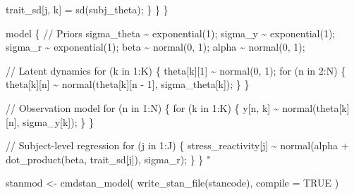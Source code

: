 \documentclass[
  11pt,
  a4paper,
  onecolumn]{article}
\newenvironment{Shaded}{}{}
\newcommand{\AttributeTok}[1]{\textcolor[rgb]{0.84,0.23,0.29}{#1}}
\newcommand{\CommentTok}[1]{\textcolor[rgb]{0.42,0.45,0.49}{#1}}
\newcommand{\ConstantTok}[1]{\textcolor[rgb]{0.00,0.36,0.77}{#1}}
\newcommand{\DecValTok}[1]{\textcolor[rgb]{0.00,0.36,0.77}{#1}}
\newcommand{\FunctionTok}[1]{\textcolor[rgb]{0.44,0.26,0.76}{#1}}
\newcommand{\NormalTok}[1]{\textcolor[rgb]{0.14,0.16,0.18}{#1}}
\newcommand{\OtherTok}[1]{\textcolor[rgb]{0.44,0.26,0.76}{#1}}
\newcommand{\SpecialCharTok}[1]{\textcolor[rgb]{0.00,0.36,0.77}{#1}}
\newcommand{\StringTok}[1]{\textcolor[rgb]{0.01,0.18,0.38}{#1}}
\begin{document}
\begin{Shaded}
\begin{Highlighting}[]
\StringTok{      trait\_sd[j, k] = sd(subj\_theta);}
\StringTok{    \}}
\StringTok{  \}}
\StringTok{\}}

\StringTok{model \{}
\StringTok{  // Priors}
\StringTok{  sigma\_theta \textasciitilde{} exponential(1);}
\StringTok{  sigma\_y \textasciitilde{} exponential(1);}
\StringTok{  sigma\_r \textasciitilde{} exponential(1);}
\StringTok{  beta \textasciitilde{} normal(0, 1);}
\StringTok{  alpha \textasciitilde{} normal(0, 1);}

\StringTok{  // Latent dynamics}
\StringTok{  for (k in 1:K) \{}
\StringTok{    theta[k][1] \textasciitilde{} normal(0, 1);}
\StringTok{    for (n in 2:N) \{}
\StringTok{      theta[k][n] \textasciitilde{} normal(theta[k][n {-} 1], sigma\_theta[k]);}
\StringTok{    \}}
\StringTok{  \}}

\StringTok{  // Observation model}
\StringTok{  for (n in 1:N) \{}
\StringTok{    for (k in 1:K) \{}
\StringTok{      y[n, k] \textasciitilde{} normal(theta[k][n], sigma\_y[k]);}
\StringTok{    \}}
\StringTok{  \}}

\StringTok{  // Subject{-}level regression}
\StringTok{  for (j in 1:J) \{}
\StringTok{    stress\_reactivity[j] \textasciitilde{} normal(alpha + dot\_product(beta, trait\_sd[j]), sigma\_r);}
\StringTok{  \}}
\StringTok{\}}
\StringTok{"}
\end{Highlighting}
\end{Shaded}

\begin{Shaded}
\begin{Highlighting}[]
\NormalTok{stanmod }\OtherTok{\textless{}{-}} \FunctionTok{cmdstan\_model}\NormalTok{(}
  \FunctionTok{write\_stan\_file}\NormalTok{(stancode),}
  \AttributeTok{compile =} \ConstantTok{TRUE}
\NormalTok{)}
\end{Highlighting}
\end{Shaded}

\begin{Shaded}
\end{Shaded}
\end{document}

